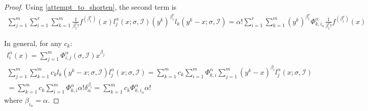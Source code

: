 \documentclass{article}
\theoremstyle{case}
\newcommand{\bidx}{{\mathcal I}}
\begin{document}
\begin{proof}
Using \cref{attempt_to_shorten}, the second term is
\begin{align*}
\sum_{j=1}^m\sum_{i=1}^r \sum_{k=1}^m\frac{1}{\beta^e_i!}f^{(\beta^e_i)}(x)l_j^{\alpha}(x; \sigma, \bidx) \left(y^k\right)^{\beta_i^e} l_k(y^k - x; \sigma, \bidx) 
= \alpha! \sum_{i=1}^r \sum_{k=1}^m\left(y^k\right)^{\beta_i^e} \Phi^{\alpha}_{k,i_{\alpha}} \frac{1}{\beta^e_i!}f^{(\beta^e_i)}(x)
\end{align*}


In general, for any $c_k$:
\begin{align*}
l_i^{\alpha}(x) = \sum_{j=1}^m \Phi^{\alpha}_{i,j}(\sigma, \bidx) x^{\beta_j} \\
\sum_{j=1}^m\sum_{k=1}^m c_k l_k(y^k - x; \sigma, \bidx)l_j^{\alpha}(x; \sigma, \bidx) 
= \sum_{k=1}^mc_k \sum_{i=1}^m \Phi^{\alpha}_{k,i}\sum_{j=1}^m (y^k - x)^{\beta_i}l_j^{\alpha}(x; \sigma, \bidx) \\
= \sum_{k=1}^mc_k \sum_{i=1}^m \Phi^{\alpha}_{k,i} \alpha! \delta_{\alpha}^{\beta_i} 
= \sum_{k=1}^mc_k \Phi^{\alpha}_{k,i_{\alpha}} \alpha! \label{attempt_to_shorten}
\end{align*}
where $\beta_{i_{\alpha}} = \alpha$.


\end{proof}
\end{document}
